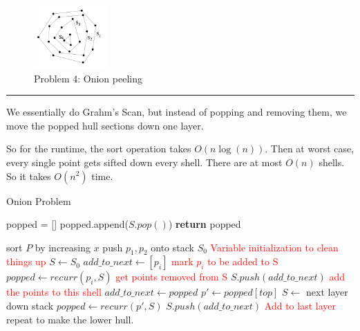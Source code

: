 \documentclass[11pt]{article}
\begin{document}
\begin{figure}[h]
    \centering
    \includegraphics[width=0.25\textwidth]{onions}
    \caption{Problem 4: Onion peeling}
\end{figure}
\hrule

We essentially do Grahm's Scan, but instead of popping and removing them,
we move the popped hull sections down one layer.

So for the runtime, the sort operation takes $O(n \log (n))$. Then at worst case, every single point gets sifted down every shell. 
There are at most $O(n)$ shells. So it takes $O(n^2)$ time.

\begin{algorithm}
    \caption{Onion Problem}
    \label{alg:onion}

    \begin{algorithmic}[1]
            \State popped = []
                \State popped.append($S.pop()$)
            \EndWhile
            \State \textbf{return} popped
        \EndFunction
        \end{algorithmic}

    \begin{algorithmic}[1]
        \State sort $P$ by increasing $x$
        \State push $p_1, p_2$ onto stack $S_0$
            \State \textcolor{red}{Variable initialization to clean things up}
            \State $S \gets S_0$ 
            \State $add\_to\_next \gets [p_i]$ \quad \textcolor{red}{mark $p_i$ to be added to S}
            \State $popped \gets recurr(p_i,S)$ \quad \textcolor{red}{get points removed from S}
                \State $S.push(add\_to\_next)$ \quad \textcolor{red}{add the points to this shell}
                \State $add\_to\_next \gets popped$
                \State $p' \gets popped[top]$
                \State $S \gets$ next layer down stack
                \State $popped \gets recurr(p', S)$
            \EndWhile
            \State $S.push(add\_to\_next)$ \quad \textcolor{red}{Add to last layer}
        \EndFor
        \State repeat to make the lower hull.
    \EndFunction
    \end{algorithmic}
\end{algorithm}
\end{document}
